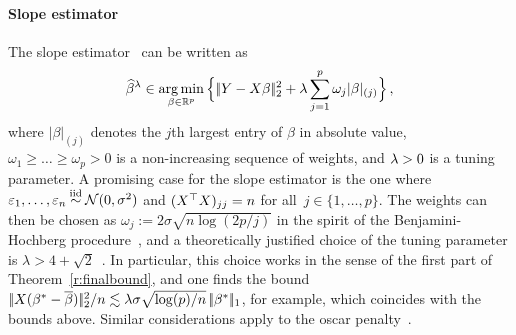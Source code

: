 \documentclass[bj]{imsart}
\newcommand{\normone}[1]{\ensuremath{\!|\!| #1 | \! |_{1}}}
\newcommand{\normtwo}[1]{\ensuremath{\!|\!| #1 | \! |_{2}}}
\newcommand{\norm}[1]{\ensuremath{\!|\!| #1 | \! |}}
\newcommand{\1}{{\rm 1}\mskip -4,5mu{\rm l} }
\newcommand{\argmin}{\mathop{\mathrm{arg\,min}}}
\newcommand{\rp}{\mathbb{R}^p}
\newcommand{\betatrue}{\beta^*}
\begin{document}
\paragraph{Slope estimator} The slope estimator~\cite{Bogdan15} can be written as
\begin{equation*}
  \estimatort \in \argmin_{\beta\in\rp}\Big\{\,\normtwo{\outcome-\design\beta}^2+\tuningparameter\sum_{j=1}^p\omega_j|\beta|_{(j)}\Big\}\,,
\end{equation*}
where $|\beta|_{(j)}$ denotes the $j$th largest entry of $\beta$ in absolute value, $\omega_1\geq \dots \geq \omega_p>0$ is a non-increasing sequence of weights, and $\lambda>0$ is a tuning parameter.  A promising case for the slope estimator is the one where $\noise_1,\dots,\noise_n\iid\mathcal N(0,\sigma^2) $ and $(\textcolor{black}{X}^\top\textcolor{black}{X})_{jj}=n$ for all~$j\in\{1,\dots,p\}.$ The weights can then be chosen as $\omega_j:=2\sigma\sqrt{n\log(2p/j)}$ in the spirit of the Benjamini-Hochberg procedure~\cite{Bogdan15,Su16}, and  a theoretically justified choice of the tuning parameter is $\lambda>4+\sqrt 2$~\cite[Equation~(2.5)]{Bellec16}. In particular, this choice works in the sense of the first part of  Theorem~\ref{r:finalbound}, and one finds the bound  $\,\normtwo{\design(\betatrue-\estimatororacle)}^2/n \lesssim \tuningparameter \sigma\sqrt{\log(p)/n}\ \normone{\betatrue}$, for example, which coincides with the bounds above. Similar considerations apply to the oscar penalty~\cite{Bondell08}.

\end{document}
